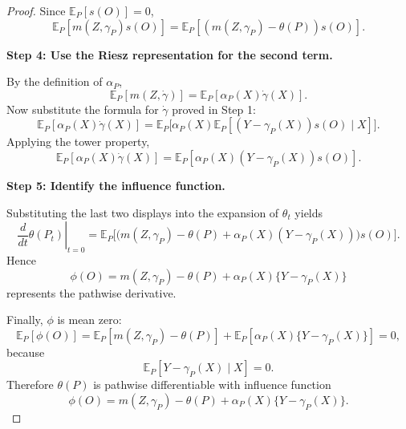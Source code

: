 \documentclass[12pt]{article}
\renewcommand{\(}{\left(}%
\renewcommand{\)}{\right)}%
\renewcommand{\[}{\left[}%
\renewcommand{\]}{\right]}%
\newtheorem{proof}{Proof.}}
\begin{document}
\begin{proof}
Since $\mathbb{E}_P[s(O)]=0$,
\begin{equation*}
\mathbb{E}_P[m(Z,\gamma_P)s(O)]
=
\mathbb{E}_P[(m(Z,\gamma_P)-\theta(P))s(O)].
\end{equation*}

\medskip
\textbf{Step 4: Use the Riesz representation for the second term.}

By the definition of $\alpha_P$,
\begin{equation*}
\mathbb{E}_P[m(Z,\dot\gamma)]
=
\mathbb{E}_P[\alpha_P(X)\dot\gamma(X)].
\end{equation*}
Now substitute the formula for $\dot\gamma$ proved in Step 1:
\begin{equation*}
\mathbb{E}_P[\alpha_P(X)\dot\gamma(X)]
=
\mathbb{E}_P\Big[
\alpha_P(X)\mathbb{E}_P[(Y-\gamma_P(X))s(O)\mid X]
\Big].
\end{equation*}
Applying the tower property,
\begin{equation*}
\mathbb{E}_P[\alpha_P(X)\dot\gamma(X)]
=
\mathbb{E}_P[\alpha_P(X)(Y-\gamma_P(X))s(O)].
\end{equation*}

\medskip
\textbf{Step 5: Identify the influence function.}

Substituting the last two displays into the expansion of $\theta_t$ yields
\begin{equation*}
\left.\frac{d}{dt}\theta(P_t)\right|_{t=0}
=
\mathbb{E}_P\Big[
\big(
m(Z,\gamma_P)-\theta(P)+\alpha_P(X)(Y-\gamma_P(X))
\big)s(O)
\Big].
\end{equation*}
Hence
\begin{equation*}
\phi(O)
=
m(Z,\gamma_P)-\theta(P)+\alpha_P(X)\{Y-\gamma_P(X)\}
\end{equation*}
represents the pathwise derivative.

Finally, $\phi$ is mean zero:
\begin{equation*}
\mathbb{E}_P[\phi(O)]
=
\mathbb{E}_P[m(Z,\gamma_P)-\theta(P)]
+
\mathbb{E}_P[\alpha_P(X)\{Y-\gamma_P(X)\}]
=
0,
\end{equation*}
because
\begin{equation*}
\mathbb{E}_P[Y-\gamma_P(X)\mid X]=0.
\end{equation*}
Therefore $\theta(P)$ is pathwise differentiable with influence function
\begin{equation*}
\boxed{
\phi(O)
=
m(Z,\gamma_P)-\theta(P)+\alpha_P(X)\{Y-\gamma_P(X)\}.
}
\end{equation*}
\end{proof}
\end{document}
